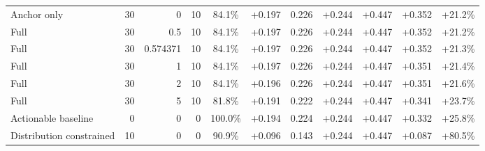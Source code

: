\begin{table}[htbp]
\begin{tabular}{lrrrccccccc}
Anchor only & 30 & 0 & 10 & 84.1\% & +0.197 & 0.226 & +0.244 & +0.447 & +0.352 & +21.2\% \\
Full & 30 & 0.5 & 10 & 84.1\% & +0.197 & 0.226 & +0.244 & +0.447 & +0.352 & +21.2\% \\
Full & 30 & 0.574371 & 10 & 84.1\% & +0.197 & 0.226 & +0.244 & +0.447 & +0.352 & +21.3\% \\
Full & 30 & 1 & 10 & 84.1\% & +0.197 & 0.226 & +0.244 & +0.447 & +0.351 & +21.4\% \\
Full & 30 & 2 & 10 & 84.1\% & +0.196 & 0.226 & +0.244 & +0.447 & +0.351 & +21.6\% \\
Full & 30 & 5 & 10 & 81.8\% & +0.191 & 0.222 & +0.244 & +0.447 & +0.341 & +23.7\% \\
Actionable baseline & 0 & 0 & 0 & 100.0\% & +0.194 & 0.224 & +0.244 & +0.447 & +0.332 & +25.8\% \\
Distribution constrained & 10 & 0 & 0 & 90.9\% & +0.096 & 0.143 & +0.244 & +0.447 & +0.087 & +80.5\% \\
\bottomrule
\end{tabular}
\end{table}
